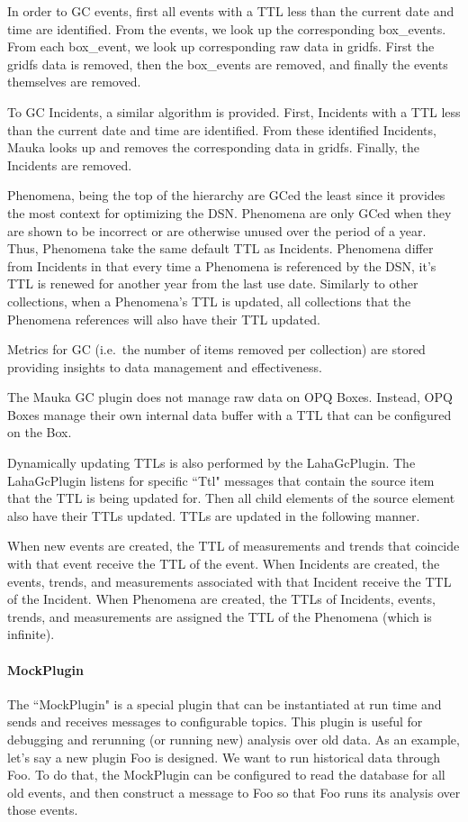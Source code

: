 In order to GC events, first all events with a TTL less than the current date and time are identified. From the events, we look up the corresponding box\_events. From each box\_event, we look up corresponding raw data in gridfs. First the gridfs data is removed, then the box\_events are removed, and finally the events themselves are removed.

To GC Incidents, a similar algorithm is provided. First, Incidents with a TTL less than the current date and time are identified. From these identified Incidents, Mauka looks up and removes the corresponding data in gridfs. Finally, the Incidents are removed.

Phenomena, being the top of the hierarchy are GCed the least since it provides the most context for optimizing the DSN. Phenomena are only GCed when they are shown to be incorrect or are otherwise unused over the period of a year. Thus, Phenomena take the same default TTL as Incidents. Phenomena differ from Incidents in that every time a Phenomena is referenced by the DSN, it's TTL is renewed for another year from the last use date. Similarly to other collections, when a Phenomena's TTL is updated, all collections that the Phenomena references will also have their TTL updated.

Metrics for GC (i.e.\ the number of items removed per collection) are stored providing insights to data management and effectiveness.

The Mauka GC plugin does not manage raw data on OPQ Boxes. Instead, OPQ Boxes manage their own internal data buffer with a TTL that can be configured on the Box.

Dynamically updating TTLs is also performed by the LahaGcPlugin. The LahaGcPlugin listens for specific ``Ttl" messages that contain the source item that the TTL is being updated for. Then all child elements of the source element also have their TTLs updated. TTLs are updated in the following manner.

When new events are created, the TTL of measurements and trends that coincide with that event receive the TTL of the event. When Incidents are created, the events, trends, and measurements associated with that Incident receive the TTL of the Incident. When Phenomena are created, the TTLs of Incidents, events, trends, and measurements are assigned the TTL of the Phenomena (which is infinite).

\paragraph{MockPlugin}
The ``MockPlugin" is a special plugin that can be instantiated at run time and sends and receives messages to configurable topics. This plugin is useful for debugging and rerunning (or running new) analysis over old data. As an example, let's say a new plugin Foo is designed. We want to run historical data through Foo. To do that, the MockPlugin can be configured to read the database for all old events, and then construct a message to Foo so that Foo runs its analysis over those events.

